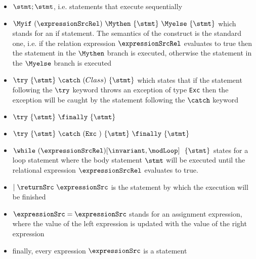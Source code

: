 \begin{itemize}
   \item $\stmt;\stmt$, i.e. statements that execute sequentially 

   \item $\Myif \ (\expressionSrcRel) \ \Mythen \ \{ \stmt \} \  \Myelse \ \{ \stmt \}  $ which stands for
         an if statement. The semantics of the construct is the standard one, i.e. if the relation expression $\expressionSrcRel$ 
	 evaluates to true then the statement in the $ \Mythen$ branch is executed, otherwise the statement in the
	 $ \Myelse$ branch is executed

   \item $ \try  \ \{ \stmt \}  \ \catch \ ( Class  )\ \{ \stmt \}  $ which states that if the
            statement following the $ \try $ keyword throws an exception of type \texttt{Exc} then
	    the exception will be caught by the statement following the  $ \catch $ keyword
	        
   \item  $ \try  \ \{ \stmt \} \ \finally \ \{ \stmt \} $ 
   \item $ \try  \ \{ \stmt \} \ \catch \ ( \mbox{\rm\texttt{Exc} }  )\ \{ \stmt \} \ \finally \ \{ \stmt \}   $
   \item $ \while \ (\expressionSrcRel) \lbrack \invariant, \modLoop \rbrack \ \do \ \{ \stmt \} $ states for a loop statement where the body statement
         $ \stmt$ will be executed until the relational expression  $\expressionSrcRel$ evaluates to true.
   \item  $ \mid \returnSrc \  \expressionSrc $ is the statement by which the execution will be finished
   \item $ \expressionSrc = \expressionSrc$ stands for an assignment expression, where the value of the left expression is updated with the value   
         of the right expression  
    \item finally, every expression $\expressionSrc$ is a statement 
 
\end{itemize}
